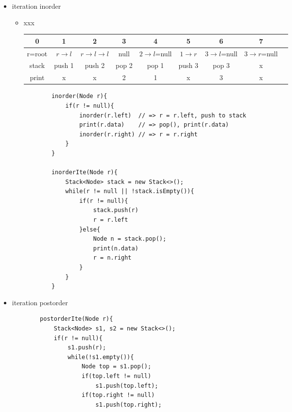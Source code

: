 \documentclass{article}
\newcommand{\arr}{\rightarrow}
\begin{document}
\begin{enumerate}
\begin{itemize}
\begin{itemize}
\begin{itemize}
        \pagebreak
        \item iteration inorder
        \begin{itemize}
         \item xxx 
         
         \begin{center}

         \begin{tabular}{|c|c|c|c|c|c|c|c|c|} \hline
         0      & 1          & 2                 & 3     & 4               & 5          & 6              & 7               \\ \hline
         r=root & $r \arr l$ & $r \arr l \arr l$ & null  & $2 \arr l$=null & $1 \arr r$ & $3\arr l$=null & $3 \arr r$=null \\ \hline
         stack  & push 1     & push 2            & pop 2 & pop 1           & push 3     & pop 3          & x               \\ \hline
         print  & x          & x                 & 2     & 1               & x          & 3              & x               \\ \hline
         \end{tabular} 
         \end{center} 
        \begin{verbatim}
        inorder(Node r){
            if(r != null){
                inorder(r.left)  // => r = r.left, push to stack
                print(r.data)    // => pop(), print(r.data)
                inorder(r.right) // => r = r.right
            }
        }

        inorderIte(Node r){
            Stack<Node> stack = new Stack<>();
            while(r != null || !stack.isEmpty()){
                if(r != null){
                    stack.push(r)
                    r = r.left
                }else{
                    Node n = stack.pop();
                    print(n.data)
                    r = n.right
                }
            }
        }

         \end{verbatim} 
        \end{itemize}
        \item iteration postorder
        \begin{verbatim}
        postorderIte(Node r){
            Stack<Node> s1, s2 = new Stack<>();
            if(r != null){
                s1.push(r);
                while(!s1.empty()){
                    Node top = s1.pop();
                    if(top.left != null)
                        s1.push(top.left);
                    if(top.right != null)
                        s1.push(top.right);


\end{verbatim}
\end{itemize}
\end{itemize}
\end{itemize}
\end{enumerate}
\end{document}
